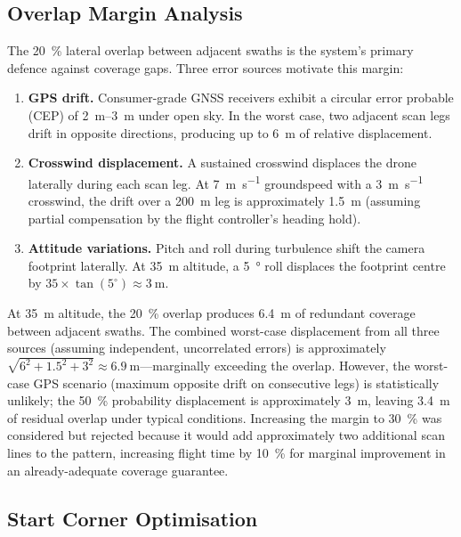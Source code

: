 \subsection{Overlap Margin Analysis}\label{sec:overlap-margin}

The \SI{20}{\percent} lateral overlap between adjacent swaths is the system's primary defence against coverage gaps.  Three error sources motivate this margin:

\begin{enumerate}
  \item \textbf{GPS drift.}  Consumer-grade GNSS receivers exhibit a circular error probable (CEP) of \SIrange{2}{3}{\metre} under open sky.  In the worst case, two adjacent scan legs drift in opposite directions, producing up to \SI{6}{\metre} of relative displacement.
  \item \textbf{Crosswind displacement.}  A sustained crosswind displaces the drone laterally during each scan leg.  At \SI{7}{\metre\per\second} groundspeed with a \SI{3}{\metre\per\second} crosswind, the drift over a \SI{200}{\metre} leg is approximately \SI{1.5}{\metre} (assuming partial compensation by the flight controller's heading hold).
  \item \textbf{Attitude variations.}  Pitch and roll during turbulence shift the camera footprint laterally.  At \SI{35}{\metre} altitude, a \SI{5}{\degree} roll displaces the footprint centre by $35 \times \tan(5^\circ) \approx \SI{3}{\metre}$.
\end{enumerate}

At \SI{35}{\metre} altitude, the \SI{20}{\percent} overlap produces \SI{6.4}{\metre} of redundant coverage between adjacent swaths.  The combined worst-case displacement from all three sources (assuming independent, uncorrelated errors) is approximately $\sqrt{6^2 + 1.5^2 + 3^2} \approx \SI{6.9}{\metre}$---marginally exceeding the overlap.  However, the worst-case GPS scenario (maximum opposite drift on consecutive legs) is statistically unlikely; the \SI{50}{\percent} probability displacement is approximately \SI{3}{\metre}, leaving \SI{3.4}{\metre} of residual overlap under typical conditions.  Increasing the margin to \SI{30}{\percent} was considered but rejected because it would add approximately two additional scan lines to the pattern, increasing flight time by \SI{10}{\percent} for marginal improvement in an already-adequate coverage guarantee.

\subsection{Start Corner Optimisation}\label{sec:start-corner}

